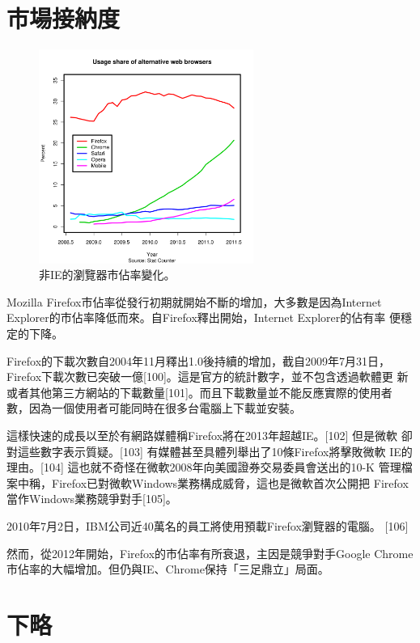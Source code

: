 \documentclass[12pt, a4paper, twoside]{article}
\begin{document}
\section{市場接納度}

\begin{figure}
  \begin{center}
    \includegraphics[width=70mm]{Usage}
  \end{center}
  \caption{非IE的瀏覽器市佔率變化。}
\end{figure}

Mozilla Firefox市佔率從發行初期就開始不斷的增加，大多數是因為Internet
Explorer的市佔率降低而來。自Firefox釋出開始，Internet Explorer的佔有率
便穩定的下降。

Firefox的下載次數自2004年11月釋出1.0後持續的增加，截自2009年7月31日，
Firefox下載次數已突破一億[100]。這是官方的統計數字，並不包含透過軟體更
新或者其他第三方網站的下載數量[101]。而且下載數量並不能反應實際的使用者
數，因為一個使用者可能同時在很多台電腦上下載並安裝。

這樣快速的成長以至於有網路媒體稱Firefox將在2013年超越IE。[102] 但是微軟
卻對這些數字表示質疑。[103] 有媒體甚至具體列舉出了10條Firefox將擊敗微軟
IE的理由。[104] 這也就不奇怪在微軟2008年向美國證券交易委員會送出的10-K
管理檔案中稱，Firefox已對微軟Windows業務構成威脅，這也是微軟首次公開把
Firefox當作Windows業務競爭對手[105]。

2010年7月2日，IBM公司近40萬名的員工將使用預載Firefox瀏覽器的電腦。
[106]

然而，從2012年開始，Firefox的市佔率有所衰退，主因是競爭對手Google
Chrome市佔率的大幅增加。但仍與IE、Chrome保持「三足鼎立」局面。

\section{下略}
\end{document}
